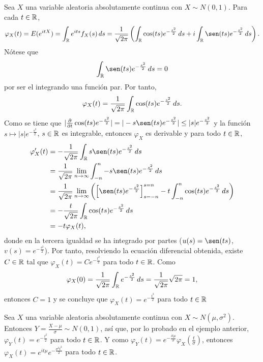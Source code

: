 \documentclass[a4paper, 11pt, extrafontsizes]{memoir}
\begin{document}
\begin{example}
    Sea $X$ una variable aleatoria absolutamente continua con $X \sim N(0,1)$. Para cada $t \in \mathbb R$,
    \[\varphi_X(t) = E(e^{itX}) = \int_\R e^{its}f_X(s) \, ds  = \frac{1}{\sqrt{2\pi}}\left(\int_\R \cos(ts)e^{-\frac{s^2}{2}} \, ds + i \int_\R \sen(ts)e^{-\frac{s^2}{2}} \, ds\right).\]
    Nótese que
    \[\int_\R \sen(ts)e^{-\frac{s^2}{2}} \, ds = 0\]
    por ser el integrando una función par. Por tanto,
    \[\varphi_X(t) = \frac{1}{\sqrt{2\pi}}\int_\mathbb R\cos(ts)e^{-\frac{s^2}{2}}\, ds.\]
    Como se tiene que  $|\frac{\partial}{\partial t}\cos(ts)e^{-\frac{s^2}{2}}| = |-s\sen(ts)e^{-\frac{s^2}{2}}| \leq |s|e^{-\frac{s^2}{2}}$ y la función $s \mapsto |s|e^{-\frac{s^2}{2}}$, $s \in \mathbb R$ es integrable, entonces $\varphi_X$ es derivable y para todo $t \in \mathbb R$,
    \[
    \begin{aligned}[t]
        \varphi_X'(t) &= -\frac{1}{\sqrt{2\pi}}\int_\R s\sen(ts)e^{-\frac{s^2}{2}}\, ds \\
        &= \frac{1}{\sqrt{2\pi}}\lim_{n\to \infty}\int_{-n}^n -s\sen(ts)e^{-\frac{s^2}{2}} \, ds \\
        &= \frac{1}{\sqrt{2\pi}}\lim_{n \to \infty} \left(\left[\sen(ts)e^{-\frac{s^2}{2}}\right]_{s=-n}^{s=n}-t \int_{-n}^n\cos(ts)e^{-\frac{s^2}{2}}\, ds\right) \\
        &= -\frac{t}{\sqrt{2\pi}}\int_\R \cos(ts)e^{-\frac{s^2}{2}} \, ds \\
        &= -t\varphi_X(t),
    \end{aligned}
    \]
    donde en la tercera igualdad se ha integrado por partes ($u(s) = \sen(ts)$, $v(s) = e^{-\frac{s^2}{2}}$). Por tanto, resolviendo la ecuación diferencial obtenida, existe $C \in \mathbb R$ tal que $\varphi_X(t)= Ce^{-\frac{t^2}{2}}$ para todo $t \in \mathbb R$. Como
    \[\varphi_X(0)=\frac{1}{\sqrt{2\pi}}\int_\mathbb R e^{-\frac{s^2}{2}}\, ds = \frac{1}{\sqrt{2\pi}}\sqrt{2\pi} = 1,\]
    entonces $C = 1$ y se concluye que $\varphi_X(t) = e^{-\frac{t^2}{2}}$ para todo $t \in \mathbb R$
\end{example}

\begin{example}
    Sea $X$ una variable aleatoria absolutamente continua con $X \sim N(\mu,\sigma^2)$. Entonces $Y = \frac{X-\mu}{\sigma} \sim N(0,1)$, así que, por lo probado en el ejemplo anterior, $\varphi_Y(t) = e^{-\frac{t^2}{2}}$ para todo $t \in \mathbb R$. Y como 
    $\varphi_Y(t) = e^{-\frac{it\mu}{\sigma}}\varphi_X\left(\frac{t}{\sigma}\right)$, entonces
    $\varphi_X(t) = e^{it\mu}e^{-\frac{\sigma^2t^2}{2}}$ para todo $t \in \mathbb R$.
\end{example}
\end{document}
